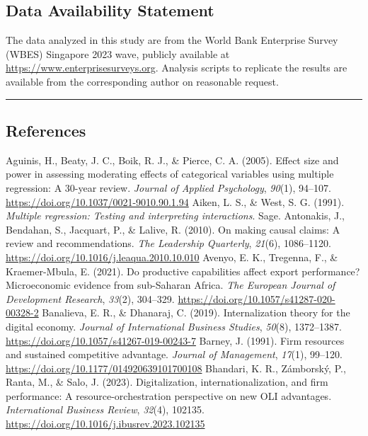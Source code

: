 \documentclass[12pt,a4paper]{article}
\begin{document}
\hypertarget{data-availability-statement}{%
\subsection{Data Availability
Statement}\label{data-availability-statement}}

The data analyzed in this study are from the World Bank Enterprise
Survey (WBES) Singapore 2023 wave, publicly available at
\url{https://www.enterprisesurveys.org}. Analysis scripts to replicate
the results are available from the corresponding author on reasonable
request.

\begin{center}\rule{0.5\linewidth}{0.5pt}\end{center}

\hypertarget{references}{%
\subsection{References}\label{references}}

Aguinis, H., Beaty, J. C., Boik, R. J., \& Pierce, C. A. (2005). Effect
size and power in assessing moderating effects of categorical variables
using multiple regression: A 30-year review. \emph{Journal of Applied
Psychology}, \emph{90}(1), 94--107.
\url{https://doi.org/10.1037/0021-9010.90.1.94} Aiken, L. S., \& West,
S. G. (1991). \emph{Multiple regression: Testing and interpreting
interactions}. Sage. Antonakis, J., Bendahan, S., Jacquart, P., \&
Lalive, R. (2010). On making causal claims: A review and
recommendations. \emph{The Leadership Quarterly}, \emph{21}(6),
1086--1120. \url{https://doi.org/10.1016/j.leaqua.2010.10.010} Avenyo,
E. K., Tregenna, F., \& Kraemer-Mbula, E. (2021). Do productive
capabilities affect export performance? Microeconomic evidence from
sub-Saharan Africa. \emph{The European Journal of Development Research},
\emph{33}(2), 304--329. \url{https://doi.org/10.1057/s41287-020-00328-2}
Banalieva, E. R., \& Dhanaraj, C. (2019). Internalization theory for the
digital economy. \emph{Journal of International Business Studies},
\emph{50}(8), 1372--1387.
\url{https://doi.org/10.1057/s41267-019-00243-7} Barney, J. (1991). Firm
resources and sustained competitive advantage. \emph{Journal of
Management}, \emph{17}(1), 99--120.
\url{https://doi.org/10.1177/014920639101700108} Bhandari, K. R.,
Zámborský, P., Ranta, M., \& Salo, J. (2023). Digitalization,
internationalization, and firm performance: A resource-orchestration
perspective on new OLI advantages. \emph{International Business Review},
\emph{32}(4), 102135.
\url{https://doi.org/10.1016/j.ibusrev.2023.102135}
\end{document}
